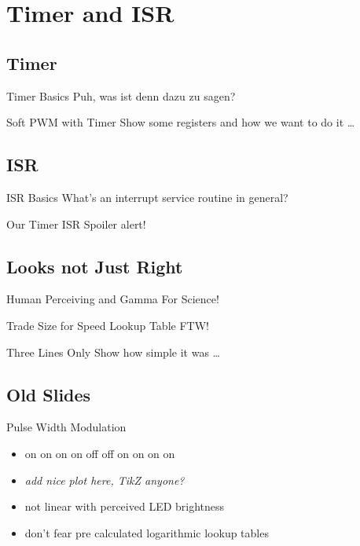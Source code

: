 \documentclass{beamer}
\begin{document}
\section{Timer and ISR}

\subsection{Timer}

\begin{frame}{Timer Basics}
    Puh, was ist denn dazu zu sagen?
\end{frame}

\begin{frame}{Soft PWM with Timer}
    Show some registers and how we want to do it …
\end{frame}

\subsection{ISR}

\begin{frame}{ISR Basics}
    What's an interrupt service routine in general?
\end{frame}

\begin{frame}{Our Timer ISR}
    Spoiler alert!
\end{frame}

\subsection{Looks not Just Right}

\begin{frame}{Human Perceiving and Gamma}
    For Science!
\end{frame}

\begin{frame}{Trade Size for Speed}
    Lookup Table FTW!
\end{frame}

\begin{frame}{Three Lines Only}
    Show how simple it was …
\end{frame}

\subsection{Old Slides}

\begin{frame}{Pulse Width Modulation}
    \begin{itemize}
        \item on on on on off off on on on on
        \pause
        \item \emph{add nice plot here, TikZ anyone?}
        \pause
        \item not linear with perceived LED brightness
        \item don't fear pre calculated logarithmic lookup tables
    \end{itemize}
\end{frame}
\end{document}
